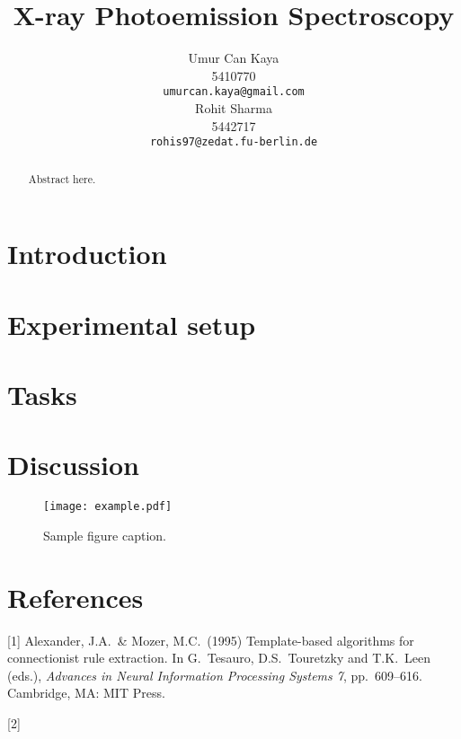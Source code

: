 \documentclass{article}
\title{X-ray Photoemission Spectroscopy}
\author{
Umur Can Kaya\\
5410770\\
\texttt{umurcan.kaya@gmail.com}\\
\And
Rohit Sharma\\
5442717\\
\texttt{rohis97@zedat.fu-berlin.de}\\
}
\begin{document}
\maketitle

\begin{abstract}
Abstract here.
\end{abstract}

\section{Introduction}


\section{Experimental setup}
\section{Tasks}
\section{Discussion}

\begin{figure}[h!]
\centering
\texttt{[image: example.pdf]}
\caption{Sample figure caption.}
\end{figure}


\section*{References}

[1] Alexander, J.A.\ \& Mozer, M.C.\ (1995) Template-based algorithms for
connectionist rule extraction. In G.\ Tesauro, D.S.\ Touretzky and T.K.\ Leen
(eds.), {\it Advances in Neural Information Processing Systems 7},
pp.\ 609--616. Cambridge, MA: MIT Press.

[2]
\end{document}
